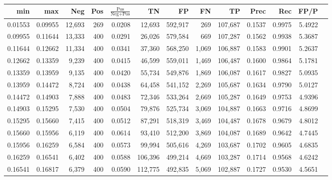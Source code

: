 \begin{tabular}{rrrrrrrrrrrrr}
\toprule
    min &     max &    Neg & Pos & $\frac{\text{Pos}}{\text{Neg}+\text{Pos}}$ &      TN &      FP &      FN &      TP &   Prec &    Rec &   FP/P \\
\midrule
0.01553 & 0.09955 & 12,693 & 269 &                                     0.0208 &  12,693 & 592,917 &     269 & 107,687 & 0.1537 & 0.9975 & 5.4922 \\
0.09955 & 0.11644 & 13,333 & 400 &                                     0.0291 &  26,026 & 579,584 &     669 & 107,287 & 0.1562 & 0.9938 & 5.3687 \\
0.11644 & 0.12662 & 11,334 & 400 &                                     0.0341 &  37,360 & 568,250 &   1,069 & 106,887 & 0.1583 & 0.9901 & 5.2637 \\
0.12662 & 0.13359 &  9,239 & 400 &                                     0.0415 &  46,599 & 559,011 &   1,469 & 106,487 & 0.1600 & 0.9864 & 5.1781 \\
0.13359 & 0.13959 &  9,135 & 400 &                                     0.0420 &  55,734 & 549,876 &   1,869 & 106,087 & 0.1617 & 0.9827 & 5.0935 \\
0.13959 & 0.14472 &  8,724 & 400 &                                     0.0438 &  64,458 & 541,152 &   2,269 & 105,687 & 0.1634 & 0.9790 & 5.0127 \\
0.14472 & 0.14903 &  7,888 & 400 &                                     0.0483 &  72,346 & 533,264 &   2,669 & 105,287 & 0.1649 & 0.9753 & 4.9396 \\
0.14903 & 0.15295 &  7,530 & 400 &                                     0.0504 &  79,876 & 525,734 &   3,069 & 104,887 & 0.1663 & 0.9716 & 4.8699 \\
0.15295 & 0.15660 &  7,415 & 400 &                                     0.0512 &  87,291 & 518,319 &   3,469 & 104,487 & 0.1678 & 0.9679 & 4.8012 \\
0.15660 & 0.15956 &  6,119 & 400 &                                     0.0614 &  93,410 & 512,200 &   3,869 & 104,087 & 0.1689 & 0.9642 & 4.7445 \\
0.15956 & 0.16259 &  6,584 & 400 &                                     0.0573 &  99,994 & 505,616 &   4,269 & 103,687 & 0.1702 & 0.9605 & 4.6835 \\
0.16259 & 0.16541 &  6,402 & 400 &                                     0.0588 & 106,396 & 499,214 &   4,669 & 103,287 & 0.1714 & 0.9568 & 4.6242 \\
0.16541 & 0.16817 &  6,379 & 400 &                                     0.0590 & 112,775 & 492,835 &   5,069 & 102,887 & 0.1727 & 0.9530 & 4.5651 \\

\end{tabular}

